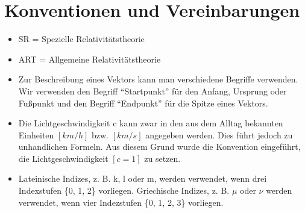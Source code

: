\section{Konventionen und Vereinbarungen}

\begin{itemize}

\item SR = Spezielle Relativitätstheorie

\item ART = Allgemeine Relativitätstheorie

\item 
Zur Beschreibung eines Vektors kann man verschiedene Begriffe verwenden. Wir verwenden den Begriff "`Startpunkt"' für den Anfang, Ursprung oder Fußpunkt und den Begriff "`Endpunkt"' für die Spitze eines Vektors. 

\item 
Die Lichtgeschwindigkeit c kann zwar in den aus dem Alltag bekannten Einheiten $ [km/h] $ bzw. $ [km/s] $  angegeben werden. Dies führt jedoch zu unhandlichen Formeln. Aus diesem Grund wurde die Konvention eingeführt, die Lichtgeschwindigkeit $ [c = 1] $ zu setzen. 

\item
Lateinische Indizes, z. B. k, l oder m, werden verwendet, wenn drei Indexstufen \{0, 1, 2\} vorliegen.
Griechische Indizes, z. B. $ \mu $ oder $ \nu $ werden verwendet, wenn vier Indezstufen \{0, 1, 2, 3\} vorliegen.


\end{itemize}



